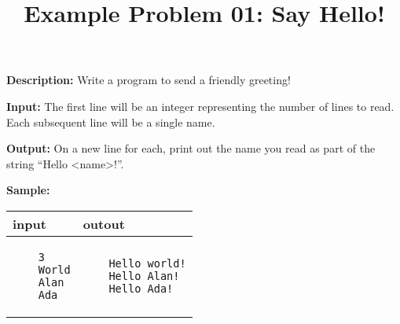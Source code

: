 \documentclass[a4paper]{article}
\title{Example Problem 01: Say Hello!}
\date{} %
\begin{document}
\lstset{
    language=java,
    basicstyle=\ttfamily,
    numbers=left,
    numbersep=8pt,
    showspaces=false,
    showstringspaces=false
}
\maketitle
\textbf{Description:} Write a program to send a friendly greeting! 

\textbf{Input:} The first line will be an integer representing the number of lines to read. Each subsequent line will be a single name.

\textbf{Output:} On a new line for each, print out the name you read as part of the string ``Hello \textless name\textgreater!''.

\textbf{Sample:}

\begin{tabular}{|p{}|p{}|}
    \hline
    \textbf{input} & \textbf{outout} \\
    \hline
    \begin{verbatim}
    3
    World
    Alan
    Ada
    \end{verbatim} &
    \begin{verbatim}
    Hello world!
    Hello Alan!
    Hello Ada!
    \end{verbatim} \\
    \hline
\end{tabular}
\end{document}
